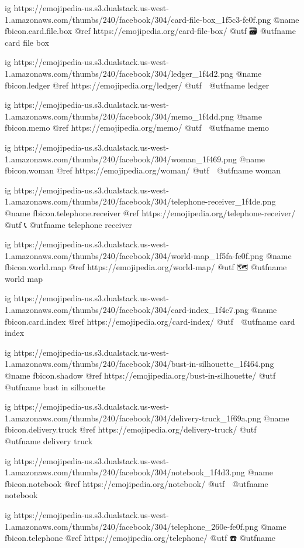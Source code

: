   ig https://emojipedia-us.s3.dualstack.us-west-1.amazonaws.com/thumbs/240/facebook/304/card-file-box_1f5c3-fe0f.png
  @name fbicon.card.file.box
  @ref https://emojipedia.org/card-file-box/
  @utf 🗃
  @utfname card file box

  ig https://emojipedia-us.s3.dualstack.us-west-1.amazonaws.com/thumbs/240/facebook/304/ledger_1f4d2.png
  @name fbicon.ledger
  @ref https://emojipedia.org/ledger/
  @utf 📒
  @utfname ledger

  ig https://emojipedia-us.s3.dualstack.us-west-1.amazonaws.com/thumbs/240/facebook/304/memo_1f4dd.png
  @name fbicon.memo
  @ref https://emojipedia.org/memo/
  @utf 📝
  @utfname memo

  ig https://emojipedia-us.s3.dualstack.us-west-1.amazonaws.com/thumbs/240/facebook/304/woman_1f469.png
  @name fbicon.woman
  @ref https://emojipedia.org/woman/
  @utf 👩
  @utfname woman

  ig https://emojipedia-us.s3.dualstack.us-west-1.amazonaws.com/thumbs/240/facebook/304/telephone-receiver_1f4de.png
  @name fbicon.telephone.receiver
  @ref https://emojipedia.org/telephone-receiver/
  @utf 📞
  @utfname telephone receiver

  ig https://emojipedia-us.s3.dualstack.us-west-1.amazonaws.com/thumbs/240/facebook/304/world-map_1f5fa-fe0f.png
  @name fbicon.world.map
  @ref https://emojipedia.org/world-map/
  @utf 🗺
  @utfname world map

  ig https://emojipedia-us.s3.dualstack.us-west-1.amazonaws.com/thumbs/240/facebook/304/card-index_1f4c7.png
  @name fbicon.card.index
  @ref https://emojipedia.org/card-index/
  @utf 📇
  @utfname card index

  ig https://emojipedia-us.s3.dualstack.us-west-1.amazonaws.com/thumbs/240/facebook/304/bust-in-silhouette_1f464.png
  @name fbicon.shadow
  @ref https://emojipedia.org/bust-in-silhouette/
  @utf 👤
  @utfname bust in silhouette

  ig https://emojipedia-us.s3.dualstack.us-west-1.amazonaws.com/thumbs/240/facebook/304/delivery-truck_1f69a.png
  @name fbicon.delivery.truck
  @ref https://emojipedia.org/delivery-truck/
  @utf 🚚
  @utfname delivery truck

  ig https://emojipedia-us.s3.dualstack.us-west-1.amazonaws.com/thumbs/240/facebook/304/notebook_1f4d3.png
  @name fbicon.notebook
  @ref https://emojipedia.org/notebook/
  @utf 📓
  @utfname notebook

  ig https://emojipedia-us.s3.dualstack.us-west-1.amazonaws.com/thumbs/240/facebook/304/telephone_260e-fe0f.png
  @name fbicon.telephone
  @ref https://emojipedia.org/telephone/
  @utf ☎️
  @utfname

